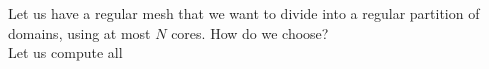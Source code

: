 \documentclass[aps,onecolumn,11pt]{revtex4}
\begin{document}
Let us have a regular mesh that we want to divide into a regular partition of domains, using at most $N$ cores.
How do we choose?\\
Let us compute all 
\end{document}
